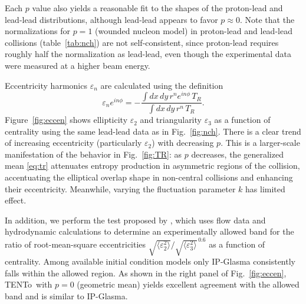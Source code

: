 \documentclass[aps,prc,reprint,amsmath,noeprint]{revtex4-1}
\newcommand{\trento}{T\raisebox{-.5ex}{R}ENTo}
\newcommand{\eccratio}{\sqrt{\langle \varepsilon_2^2 \rangle}/\sqrt{\langle \varepsilon_3^2 \rangle}^{\,0.6}}
\begin{document}
Each $p$ value also yields a reasonable fit to the shapes of the proton-lead and lead-lead distributions, although lead-lead appears to favor $p \approx 0$.
Note that the normalizations for $p = 1$ (wounded nucleon model) in proton-lead and lead-lead collisions (table~\ref{tab:nch}) are not self-consistent, since proton-lead requires roughly half the normalization as lead-lead, even though the experimental data were measured at a higher beam energy.

Eccentricity harmonics $\varepsilon_n$ are calculated using the definition
\begin{equation}
  \varepsilon_n e^{i n\phi} = -\frac{\int dx \, dy\, r^n e^{i n \phi} \, T_R}{\int dx \, dy \, r^n \, T_R}.
\end{equation}
Figure~\ref{fig:eccen} shows ellipticity $\varepsilon_2$ and triangularity $\varepsilon_3$ as a function of centrality using the same lead-lead data as in Fig.~\ref{fig:nch}.
There is a clear trend of increasing eccentricity (particularly $\varepsilon_2$) with decreasing $p$.
This is a larger-scale manifestation of the behavior in Fig.~\ref{fig:TR}:
as $p$ decreases, the generalized mean \eqref{eq:tr} attenuates entropy production in asymmetric regions of the collision, accentuating the elliptical overlap shape in non-central collisions and enhancing their eccentricity.
Meanwhile, varying the fluctuation parameter $k$ has limited effect.

In addition, we perform the test proposed by \cite{Retinskaya:2013gca}, which uses flow data and hydrodynamic calculations to determine an experimentally allowed band for the ratio of root-mean-square eccentricities $\eccratio$ as a function of centrality.
Among available initial condition models only IP-Glasma consistently falls within the allowed region.
As shown in the right panel of Fig.~\ref{fig:eccen}, \trento\ with $p = 0$ (geometric mean) yields excellent agreement with the allowed band and is similar to IP-Glasma.
\end{document}

